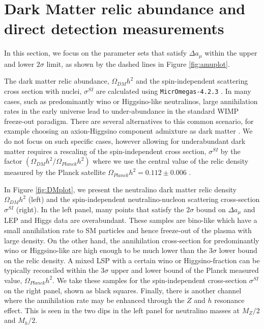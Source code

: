\section{Dark Matter relic abundance and direct detection measurements}

In this section, we focus on the parameter sets that satisfy $\Delta a_{\mu}$ within the upper and lower $2\sigma$ limit, as shown by the dashed lines in Figure \ref{fig:amuplot}.

The dark matter relic abundance, $\Omega_{DM} h^2$ and the spin-independent scattering cross section with nuclei, $\sigma^{SI}$ are calculated using \texttt{MicrOmegas-4.2.3} \cite{RN311,RN620,RN621}. In many cases, such as predominantly wino or Higgsino-like neutralinos, large annihilation rates in the early universe lead to under-abundance in the standard WIMP freeze-out paradigm. There are several alternatives to this common scenario, for example choosing an axion-Higgsino component admixture as dark matter \cite{RN173}. We do not focus on such specific cases, however allowing for underabundant dark matter requires a rescaling of the spin-independent cross section, $\sigma^{SI}$ by the factor $(\Omega_{DM}h^2/\Omega_{Planck}h^2)$ where we use the central value of the relic density measured by the Planck satellite $\Omega_{Planck}h^2=0.112 \pm 0.006$ \cite{RN499}.

In Figure \ref{fig:DMplot}, we present the neutralino dark matter relic density $\Omega_{DM}h^2$ (left) and the spin-independent neutralino-nucleon scattering cross-section $\sigma^{SI}$ (right). In the left panel, many points that satisfy the $2\sigma$ bound on $\Delta a_{\mu}$ and LEP and Higgs data are overabundant. These samples are bino-like which have a small annihilation rate to SM particles and hence freeze-out of the plasma with large density. On the other hand, the annihilation cross-section for predominantly wino or Higgsino-like are high enough to be much lower than the $3\sigma$ lower bound on the relic density. A mixed LSP with a certain wino or Higgsino-fraction \cite{RN175} can be typically reconciled within the $3\sigma$ upper and lower bound of the Planck measured value, $\Omega_{Planck}h^2$. We take these samples for the spin-independent cross-section $\sigma^{SI}$ on the right panel, shown as black squares. Finally, there is another channel where the annihilation rate may be enhanced through the $Z$ and $h$ resonance effect. This is seen in the two dips in the left panel for neutralino masses at $M_Z/2$ and $M_h/2$.

